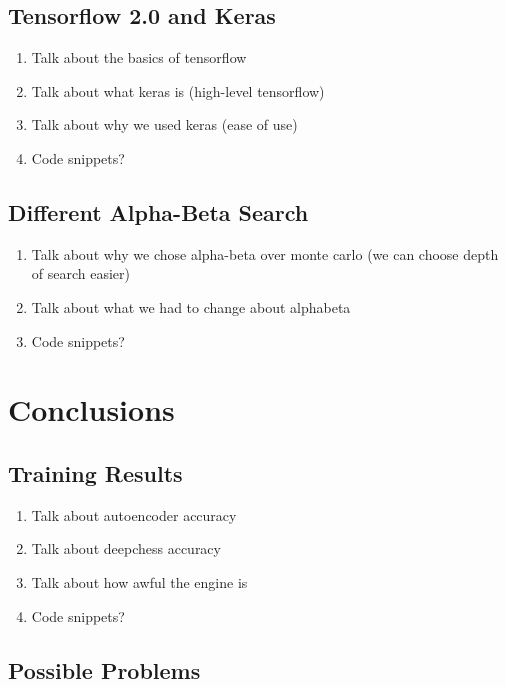 \documentclass[12pt]{article}
\begin{document}
    \subsection{Tensorflow 2.0 and Keras}

    \begin{enumerate}
        \item Talk about the basics of tensorflow
        \item Talk about what keras is (high-level tensorflow)
        \item Talk about why we used keras (ease of use)
        \item Code snippets?
    \end{enumerate}

    \subsection{Different Alpha-Beta Search}

    \begin{enumerate}
        \item Talk about why we chose alpha-beta over monte carlo (we can choose depth of search easier)
        \item Talk about what we had to change about alphabeta
        \item Code snippets?
    \end{enumerate}
    
    \section{Conclusions}

    \subsection{Training Results}

    \begin{enumerate}
        \item Talk about autoencoder accuracy 
        \item Talk about deepchess accuracy 
        \item Talk about how awful the engine is 
        \item Code snippets?
    \end{enumerate}

    \subsection{Possible Problems}
\end{document}
